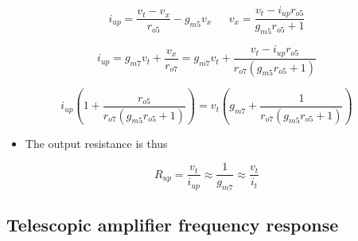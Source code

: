 \documentclass[11pt]{article}
\providecommand{\tightlist}{%
      \setlength{\itemsep}{0pt}\setlength{\parskip}{0pt}}
\begin{document}
    \begin{equation}
i_{up} = \dfrac{v_t - v_x}{r_{o5}} - g_{m5}v_x \:\:\:\:\:\:\: v_x = \dfrac{v_t - i_{up}r_{o5}}{g_{m5}r_{o5}+1}
\end{equation}

\begin{equation}
i_{up} = g_{m7}v_t+\dfrac{v_x}{r_{o7}} = g_{m7}v_t + \dfrac{v_t-i_{up}r_{o5}}{r_{o7}(g_{m5}r_{o5}+1)}
\end{equation}

\begin{equation}
i_{up}\left(1+\dfrac{r_{o5}}{r_{o7}(g_{m5}r_{o5}+1)}\right) = v_t\left(g_{m7}+\dfrac{1}{r_{o7}(g_{m5}r_{o5}+1)}\right)
\end{equation}

\begin{itemize}
\tightlist
\item
  The output resistance is thus
\end{itemize}

\begin{equation}
\boxed{R_{up} = \dfrac{v_t}{i_{up}}\approx \dfrac{1}{g_{m7}} \approx \dfrac{v_t}{i_t}}
\end{equation}

    \hypertarget{telescopic-amplifier-frequency-response}{%
\subsection{Telescopic amplifier frequency
response}\label{telescopic-amplifier-frequency-response}}
\end{document}

